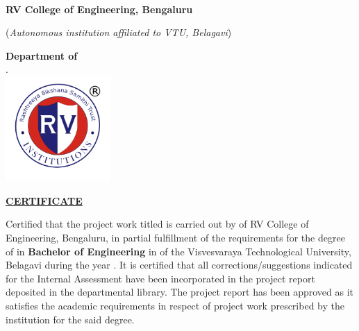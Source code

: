 \thispagestyle{empty}
\vspace{-1cm}
\begin{center}
\Large\textbf{RV College of Engineering\textsuperscript{\small\textregistered}, Bengaluru} \par
\large{(\textit{Autonomous institution affiliated to VTU, Belagavi})} \par
\large\textbf{Department of \printDepartmentLF}\\
.\hspace{2cm}\\
\includegraphics[width=4cm]{Common Figures/RV_logoVec}\par
\Large\textbf{\underline{CERTIFICATE}} \par
\end{center}
\begin{spacing}{1.5}
\noindent Certified that the \fi project work titled \textbf{\textit{\printTitle}} is carried out by
\fi
of RV College of Engineering, Bengaluru, in partial fulfillment of the requirements for the degree of  \ifPG \textbf{\printMastersInLF} in \textbf{\printMastersPrgName} \else\textbf{Bachelor of Engineering} in \textbf{\printDepartmentLF} \fi of the Visvesvaraya Technological University, Belagavi during the year \printAcadYear. It is certified that all corrections/suggestions indicated for the Internal Assessment have been incorporated in the \fi project report deposited in the departmental library. The \fi project report has been approved as it satisfies the academic requirements in respect of \fi project work prescribed by the institution for the said degree.\\ \par
\end{spacing}

